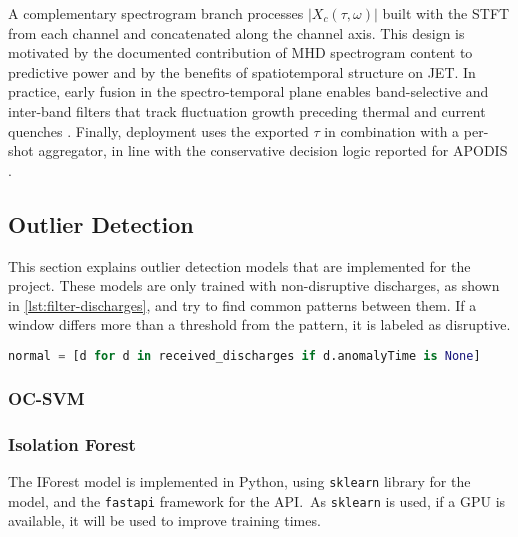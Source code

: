A complementary spectrogram branch processes $|X_c(\tau,\omega)|$ built with the \ac{STFT} from each channel and concatenated along the channel axis. This design is motivated by the documented contribution of \ac{MHD} spectrogram content to predictive power and by the benefits of spatiotemporal structure on \ac{JET}. In practice, early fusion in the spectro-temporal plane enables band-selective and inter-band filters that track fluctuation growth preceding thermal and current quenches \cite{aymerichMHDSpectrogramContribution2024,aymerichDisruptionPredictionJET2022}. Finally, deployment uses the exported $\tau$ in combination with a per-shot aggregator, in line with the conservative decision logic reported for \ac{APODIS} \cite{dormido-cantoDevelopmentEfficientRealtime2013}.


\subsection{Outlier Detection}

This section explains outlier detection models that are implemented for the project. These models are only trained with non-disruptive discharges, as shown in \autoref{lst:filter-discharges}, and try to find common patterns between them. If a window differs more than a threshold from the pattern, it is labeled as disruptive.

\begin{lstlisting}[language=Python, caption={Filtering discharges on outlier detection models. Extracted from \ac{IForest} repository \autocite{OutlierClassifierPy_iforestPython}.}, label={lst:filter-discharges}]
normal = [d for d in received_discharges if d.anomalyTime is None]
\end{lstlisting}

\subsubsection{\acs{OC-SVM}}

\subsubsection{Isolation Forest}\label{sec:iforest-implementation}

The \ac{IForest} model is implemented in Python, using \texttt{sklearn} library for the model, and the \texttt{fastapi} framework for the API.\ As \texttt{sklearn} is used, if a \ac{GPU} is available, it will be used to improve training times.

